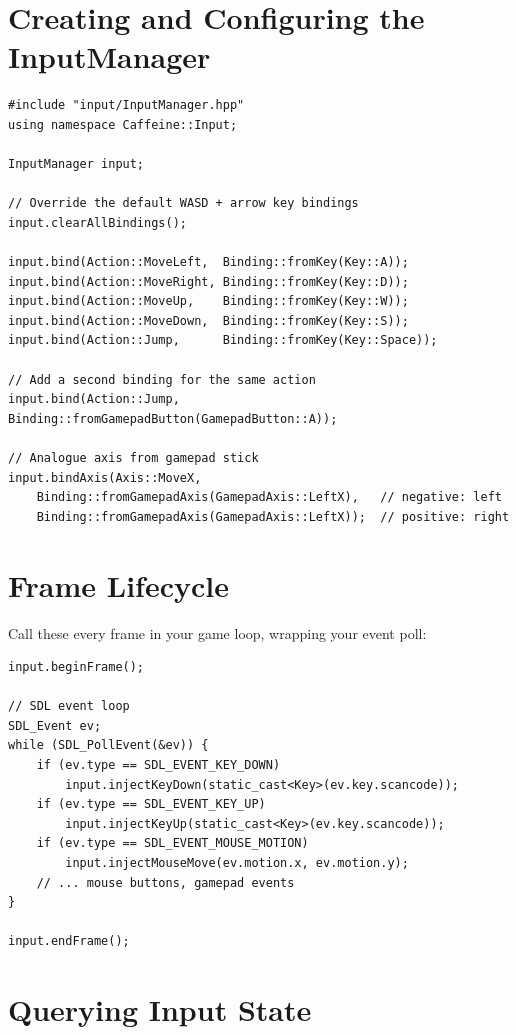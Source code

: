 \section{Creating and Configuring the InputManager}

\begin{lstlisting}
#include "input/InputManager.hpp"
using namespace Caffeine::Input;

InputManager input;

// Override the default WASD + arrow key bindings
input.clearAllBindings();

input.bind(Action::MoveLeft,  Binding::fromKey(Key::A));
input.bind(Action::MoveRight, Binding::fromKey(Key::D));
input.bind(Action::MoveUp,    Binding::fromKey(Key::W));
input.bind(Action::MoveDown,  Binding::fromKey(Key::S));
input.bind(Action::Jump,      Binding::fromKey(Key::Space));

// Add a second binding for the same action
input.bind(Action::Jump, Binding::fromGamepadButton(GamepadButton::A));

// Analogue axis from gamepad stick
input.bindAxis(Axis::MoveX,
    Binding::fromGamepadAxis(GamepadAxis::LeftX),   // negative: left
    Binding::fromGamepadAxis(GamepadAxis::LeftX));  // positive: right
\end{lstlisting}

\section{Frame Lifecycle}

Call these every frame in your game loop, wrapping your event poll:

\begin{lstlisting}
input.beginFrame();

// SDL event loop
SDL_Event ev;
while (SDL_PollEvent(&ev)) {
    if (ev.type == SDL_EVENT_KEY_DOWN)
        input.injectKeyDown(static_cast<Key>(ev.key.scancode));
    if (ev.type == SDL_EVENT_KEY_UP)
        input.injectKeyUp(static_cast<Key>(ev.key.scancode));
    if (ev.type == SDL_EVENT_MOUSE_MOTION)
        input.injectMouseMove(ev.motion.x, ev.motion.y);
    // ... mouse buttons, gamepad events
}

input.endFrame();
\end{lstlisting}

\section{Querying Input State}

